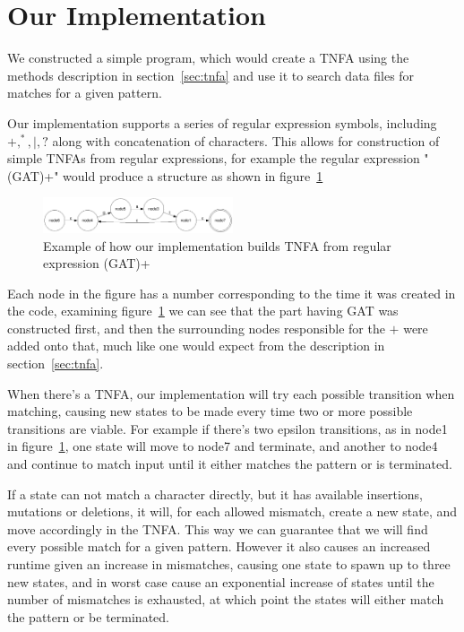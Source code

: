 \section{Our Implementation}
We constructed  a simple program, which would create a TNFA using the methods description in section~\ref{sec:tnfa} and use it to search data files for matches for a given pattern.

Our implementation supports a series of regular expression symbols, including $+, ^*, |, ?$ along with concatenation of characters. This allows for construction of simple TNFAs from regular expressions, for example the regular expression "(GAT)+" would produce a structure as shown in figure~\ref{fig:gat}

\begin{figure}[h!]
\centering
\includegraphics[width=0.5\textwidth]{lib/gat.png}
\caption{Example of how our implementation builds TNFA from regular expression (GAT)+}
\label{fig:gat}
\end{figure}

Each node in the figure has a number corresponding to the time it was created in the code, examining figure~\ref{fig:gat} we can see that the part having GAT was constructed first, and then the surrounding nodes responsible for the $+$ were added onto that, much like one would expect from the description in section~\ref{sec:tnfa}.

When there's a TNFA, our implementation will try each possible transition when matching, causing new states to be made every time two or more possible transitions are viable. For example if there's two epsilon transitions, as in node1 in figure~\ref{fig:gat}, one state will move to node7 and terminate, and another to node4 and continue to match input until it either matches the pattern or is terminated.

If a state can not match a character directly, but it has available insertions, mutations or deletions, it will, for each allowed mismatch,  create a new state, and move accordingly in the TNFA. This way we can guarantee that we will find every possible match for a given pattern. However it also causes an increased runtime given an increase in mismatches, causing one state to spawn up to three new states, and in worst case cause an exponential increase of states until the number of mismatches is exhausted, at which point the states will either match the pattern or be terminated.


